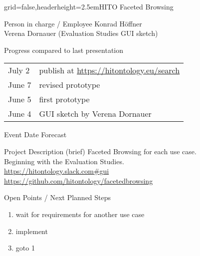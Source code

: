 \documentclass[]{kiesgrube}
\begin{document}
\begin{poster}%
{grid=false,headerheight=2.5em}{}{HITO Faceted Browsing}{}

\begin{posterbox}[name=person,column=0,row=0]{Person in charge / Employee}
Konrad Höffner\\
Verena Dornauer (Evaluation Studies GUI sketch) 
\end{posterbox}
\begin{posterbox}[name=progress,below=person]{Progress compared to last presentation}
\begin{tabular}{ll}
July 2	&publish at \url{https://hitontology.eu/search}\\
June 7	&revised prototype\\
June 5	&first prototype\\
June 4	&GUI sketch by Verena Dornauer\\
\end{tabular}
\end{posterbox}
\begin{posterbox}[name=event,below=progress]{Event Date Forecast}
\end{posterbox}
\begin{posterbox}[name=description,column=1,row=0]{Project Description (brief)}
Faceted Browsing for each use case.\\
Beginning with the Evaluation Studies.\\
\url{https://hitontology.slack.com#gui}\\
\url{https://github.com/hitontology/facetedbrowsing}
\end{posterbox}
\begin{posterbox}[name=open,column=1,below=description]{Open Points / Next Planned Steps}
\begin{enumerate}
\item wait for requirements for another use case
\item implement
\item goto 1 
\end{enumerate}
\end{posterbox}

\end{poster}
\end{document}
